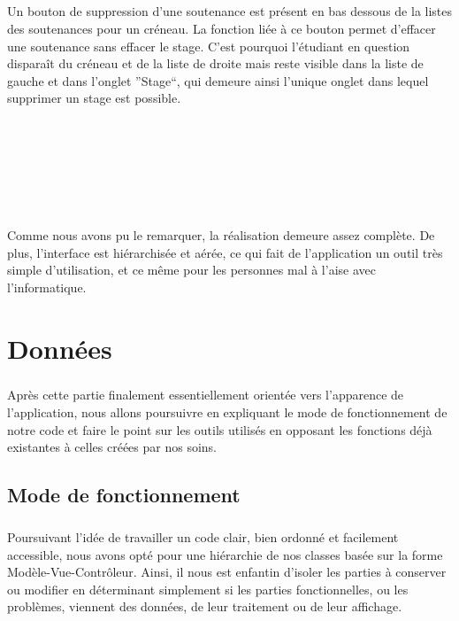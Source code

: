 \documentclass[a4paper,10pt]{report}
\begin{document}
	      \paragraph{}
		Un bouton de suppression d'une soutenance est présent en bas dessous de la listes des soutenances pour un créneau.
		La fonction liée à ce bouton permet d'effacer une soutenance sans effacer le stage.
		C'est pourquoi l'étudiant en question disparaît du créneau et de la liste de droite mais reste visible dans la liste de gauche et dans l'onglet ''Stage``, qui demeure ainsi l'unique onglet dans lequel supprimer un stage est possible.
		
		~\\
		~\\
		~\\
		~\\
		~\\
	      \paragraph{}
		Comme nous avons pu le remarquer, la réalisation demeure assez complète.
		De plus, l'interface est hiérarchisée et aérée, ce qui fait de l'application un outil très simple d'utilisation, et ce même pour les personnes mal à l'aise avec l'informatique.
		
  \chapter{Données}
      \paragraph{}
	Après cette partie finalement essentiellement orientée vers l'apparence de l'application, nous allons poursuivre en expliquant le mode de fonctionnement de notre code et faire le point sur les outils utilisés en opposant les fonctions déjà existantes à celles créées par nos soins.
		   
    \section{Mode de fonctionnement}
      \paragraph{}
	Poursuivant l'idée de travailler un code clair, bien ordonné et facilement accessible, nous avons opté pour une hiérarchie de nos classes basée sur la forme Modèle-Vue-Contrôleur.
	Ainsi, il nous est enfantin d'isoler les parties à conserver ou modifier en déterminant simplement si les parties fonctionnelles, ou les problèmes, viennent des données, de leur traitement ou de leur affichage.
      
\end{document}
